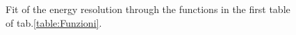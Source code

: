 \begin{figure}[H]
	\begin{minipage}[c]{0.5\linewidth}
	\end{minipage}
	\begin{minipage}[]{0.5\linewidth}
	\centering
	\end{minipage}
	\caption{Fit of the energy resolution through the functions in the first table of tab.\ref{table:Funzioni}.}
    \label{fig:resolution}
	\end{figure}

